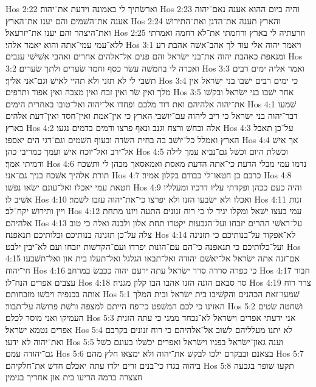 Hos 2:22  וארשׂתיך לי באמונה וידעת את־יהוה׃
Hos 2:23  והיה ביום ההוא אענה נאם־יהוה אענה את־השׁמים והם יענו את־הארץ׃
Hos 2:24  והארץ תענה את־הדגן ואת־התירושׁ ואת־היצהר והם יענו את־יזרעאל׃
Hos 2:25  וזרעתיה לי בארץ ורחמתי את־לא רחמה ואמרתי ללא־עמי עמי־אתה והוא יאמר אלהי׃
Hos 3:1  ויאמר יהוה אלי עוד לך אהב־אשׁה אהבת רע ומנאפת כאהבת יהוה את־בני ישׂראל והם פנים אל־אלהים אחרים ואהבי אשׁישׁי ענבים׃
Hos 3:2  ואכרה לי בחמשׁה עשׂר כסף וחמר שׂערים ולתך שׂערים׃
Hos 3:3  ואמר אליה ימים רבים תשׁבי לי לא תזני ולא תהיי לאישׁ וגם־אני אליך׃
Hos 3:4  כי ימים רבים ישׁבו בני ישׂראל אין מלך ואין שׂר ואין זבח ואין מצבה ואין אפוד ותרפים׃
Hos 3:5  אחר ישׁבו בני ישׂראל ובקשׁו את־יהוה אלהיהם ואת דוד מלכם ופחדו אל־יהוה ואל־טובו באחרית הימים׃
Hos 4:1  שׁמעו דבר־יהוה בני ישׂראל כי ריב ליהוה עם־יושׁבי הארץ כי אין־אמת ואין־חסד ואין־דעת אלהים בארץ׃
Hos 4:2  אלה וכחשׁ ורצח וגנב ונאף פרצו ודמים בדמים נגעו׃
Hos 4:3  על־כן תאבל הארץ ואמלל כל־יושׁב בה בחית השׂדה ובעוף השׁמים וגם־דגי הים יאספו׃
Hos 4:4  אך אישׁ אל־ירב ואל־יוכח אישׁ ועמך כמריבי כהן׃
Hos 4:5  וכשׁלת היום וכשׁל גם־נביא עמך לילה ודמיתי אמך׃
Hos 4:6  נדמו עמי מבלי הדעת כי־אתה הדעת מאסת ואמאסאך מכהן לי ותשׁכח תורת אלהיך אשׁכח בניך גם־אני׃
Hos 4:7  כרבם כן חטאו־לי כבודם בקלון אמיר׃
Hos 4:8  חטאת עמי יאכלו ואל־עונם ישׂאו נפשׁו׃
Hos 4:9  והיה כעם ככהן ופקדתי עליו דרכיו ומעלליו אשׁיב לו׃
Hos 4:10  ואכלו ולא ישׂבעו הזנו ולא יפרצו כי־את־יהוה עזבו לשׁמר׃
Hos 4:11  זנות ויין ותירושׁ יקח־לב׃
Hos 4:12  עמי בעצו ישׁאל ומקלו יגיד לו כי רוח זנונים התעה ויזנו מתחת אלהיהם׃
Hos 4:13  על־ראשׁי ההרים יזבחו ועל־הגבעות יקטרו תחת אלון ולבנה ואלה כי טוב צלה על־כן תזנינה בנותיכם וכלותיכם תנאפנה׃
Hos 4:14  לא־אפקוד על־בנותיכם כי תזנינה ועל־כלותיכם כי תנאפנה כי־הם עם־הזנות יפרדו ועם־הקדשׁות יזבחו ועם לא־יבין ילבט׃
Hos 4:15  אם־זנה אתה ישׂראל אל־יאשׁם יהודה ואל־תבאו הגלגל ואל־תעלו בית און ואל־תשׁבעו חי־יהוה׃
Hos 4:16  כי כפרה סררה סרר ישׂראל עתה ירעם יהוה ככבשׂ במרחב׃
Hos 4:17  חבור עצבים אפרים הנח־לו׃
Hos 4:18  סר סבאם הזנה הזנו אהבו הבו קלון מגניה׃
Hos 4:19  צרר רוח אותה בכנפיה ויבשׁו מזבחותם׃
Hos 5:1  שׁמעו־זאת הכהנים והקשׁיבו בית ישׂראל ובית המלך האזינו כי לכם המשׁפט כי־פח הייתם למצפה ורשׁת פרושׂה על־תבור׃
Hos 5:2  ושׁחטה שׂטים העמיקו ואני מוסר לכלם׃
Hos 5:3  אני ידעתי אפרים וישׂראל לא־נכחד ממני כי עתה הזנית אפרים נטמא ישׂראל׃
Hos 5:4  לא יתנו מעלליהם לשׁוב אל־אלהיהם כי רוח זנונים בקרבם ואת־יהוה לא ידעו׃
Hos 5:5  וענה גאון־ישׂראל בפניו וישׂראל ואפרים יכשׁלו בעונם כשׁל גם־יהודה עמם׃
Hos 5:6  בצאנם ובבקרם ילכו לבקשׁ את־יהוה ולא ימצאו חלץ מהם׃
Hos 5:7  ביהוה בגדו כי־בנים זרים ילדו עתה יאכלם חדשׁ את־חלקיהם׃
Hos 5:8  תקעו שׁופר בגבעה חצצרה ברמה הריעו בית און אחריך בנימין׃
